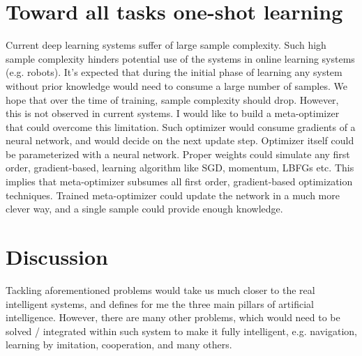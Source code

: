 \documentclass{article}
\begin{document}
\section{Toward all tasks one-shot learning}
Current deep learning systems suffer of large sample complexity. Such 
high sample complexity hinders potential use of the systems in online 
learning systems (e.g. robots). It’s expected that during the initial phase of 
learning any system without prior knowledge would need to consume a large number of samples. 
We hope that over the time of training, sample complexity should drop. However, this is 
not observed in current systems. I would like to build a meta-optimizer that could 
overcome this limitation. Such optimizer would consume gradients of a neural network, 
and would decide on the next update step. Optimizer itself could be parameterized 
with a neural network. Proper weights could simulate any first order, gradient-based, 
learning algorithm like SGD, momentum, LBFGs etc. This implies that meta-optimizer 
subsumes all first order, gradient-based optimization techniques. Trained meta-optimizer 
could update the network in a much more clever way, and a single sample could provide enough knowledge.



\section{Discussion}
Tackling aforementioned problems would take us much closer to the
real intelligent systems, and defines for me the three main pillars 
of artificial intelligence. However, there are many other problems, which 
would need to be solved / integrated within such system to make it fully 
intelligent, e.g. navigation, learning by imitation, cooperation, and many others.




\end{document}
